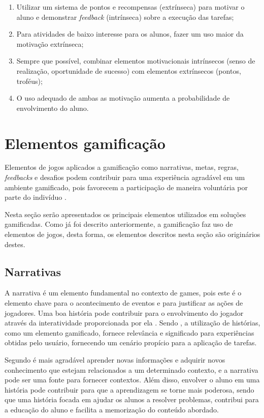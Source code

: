 \documentclass[
	12pt,				%
	oneside,			%
	a4paper,			%
	english,			%
	french,				%
	spanish,			%
	brazil,				%
	]{abntex2}
\begin{document}
\begin{enumerate}
\item Utilizar um sistema de pontos e recompensas (extrínseca) para motivar o aluno e demonstrar \textit{feedback} (intrínseca) sobre a execução das tarefas;
\item Para atividades de baixo interesse para os alunos, fazer um uso maior da motivação extrínseca;
\item Sempre que possível, combinar elementos motivacionais intrínsecos (senso de realização, oportunidade de sucesso) com elementos extrínsecos (pontos, troféus);
\item O uso adequado de ambas as motivação aumenta a probabilidade de envolvimento do aluno.
\end{enumerate}

\section{Elementos gamificação}

Elementos de jogos aplicados a gamificação como narrativas, metas, regras, \textit{feedbacks} e desafios podem contribuir para uma experiência agradável em um ambiente gamificado, pois favorecem a participação de maneira voluntária por parte do indivíduo \cite{busarello2016gamificaccao}.

Nesta seção serão apresentados os principais elementos utilizados em soluções gamificadas. Como já foi descrito anteriormente, a gamificação faz uso de elementos de jogos, desta forma, os elementos descritos nesta seção são originários destes.

\subsection{Narrativas}

A narrativa é um elemento fundamental no contexto de games, pois este é o elemento chave para o acontecimento de eventos e para justificar as ações de jogadores. Uma boa história pode contribuir para o envolvimento do jogador através da interatividade proporcionada por ela  \cite{fardo2013gamificaccao}. Sendo \citet{kaap:2014}, a utilização de histórias, como um elemento gamificado, fornece relevância e significado para experiências obtidas pelo usuário, fornecendo um cenário propício para a aplicação de tarefas.

Segundo \citet{fardo2013gamificaccao} é mais agradável aprender novas informações e adquirir novos conhecimento que estejam relacionados a um determinado contexto, e a narrativa pode ser uma fonte para fornecer contextos. Além disso, envolver o aluno em uma história pode contribuir para que a aprendizagem se torne mais poderosa, sendo que uma história focada em ajudar os alunos a resolver problemas, contribui para a educação do aluno e facilita a memorização do conteúdo abordado.
\end{document}

